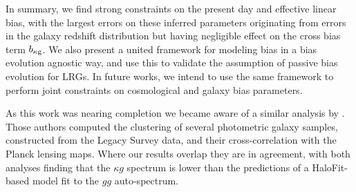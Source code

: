 In summary, we find strong constraints on the present day and effective linear bias, with the largest errors on these inferred parameters originating from errors in the galaxy redshift distribution but having negligible effect on the cross bias term $b_{\rm \kappa g}$. We also present a united framework for modeling bias in a bias evolution agnostic way, and use this to validate the assumption of passive bias evolution for LRGs. In future works, we intend to use the same framework to perform joint constraints on cosmological and galaxy bias parameters.

As this work was nearing completion we became aware of a similar analysis by \citet{Hang20}.  Those authors computed the clustering of several photometric galaxy samples, constructed from the Legacy Survey data, and their cross-correlation with the Planck lensing maps.  Where our results overlap they are in agreement, with both analyses finding that the $\kappa g$ spectrum is lower than the predictions of a HaloFit-based model fit to the $gg$ auto-spectrum.